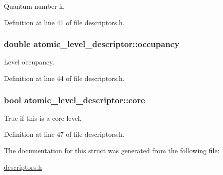 Quantum number k. 



Definition at line 41 of file descriptors.\+h.

\hypertarget{structatomic__level__descriptor_ac4be6454ae689054fdd700814f1c9030}{}
\subsubsection[{occupancy}]{\setlength{\rightskip}{0pt plus 5cm}double atomic\+\_\+level\+\_\+descriptor\+::occupancy}\label{structatomic__level__descriptor_ac4be6454ae689054fdd700814f1c9030}


Level occupancy. 



Definition at line 44 of file descriptors.\+h.

\hypertarget{structatomic__level__descriptor_a6b236231375cd46a86d69c189e96a08d}{}
\subsubsection[{core}]{\setlength{\rightskip}{0pt plus 5cm}bool atomic\+\_\+level\+\_\+descriptor\+::core}\label{structatomic__level__descriptor_a6b236231375cd46a86d69c189e96a08d}


True if this is a core level. 



Definition at line 47 of file descriptors.\+h.



The documentation for this struct was generated from the following file\+:\begin{DoxyCompactItemize}
\item 
\hyperlink{descriptors_8h}{descriptors.\+h}\end{DoxyCompactItemize}
